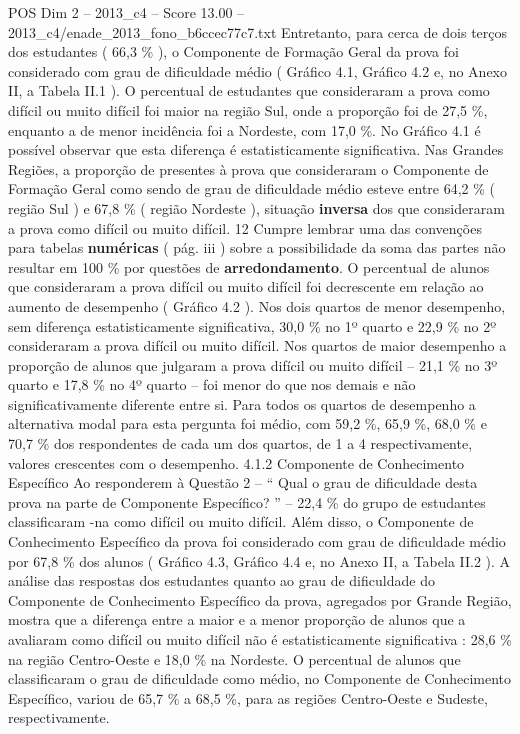 \begin{textsample}{POS Dim 2 – 2013\_c4 – Score 13.00 – 2013\_c4/enade\_2013\_fono\_b6ccec77c7.txt}
Entretanto, para cerca de dois terços dos estudantes ( 66,3 \% ), o Componente de Formação Geral da prova foi considerado com grau de dificuldade médio ( Gráfico 4.1, Gráfico 4.2 e, no Anexo II, a Tabela II.1 ).
O percentual de estudantes que consideraram a prova como difícil ou muito difícil foi maior na região Sul, onde a proporção foi de 27,5 \%, enquanto a de menor incidência foi a Nordeste, com 17,0 \%.
No Gráfico 4.1 é possível observar que esta diferença é estatisticamente significativa.
Nas Grandes Regiões, a proporção de presentes à prova que consideraram o Componente de Formação Geral como sendo de grau de dificuldade médio esteve entre 64,2 \% ( região Sul ) e 67,8 \% ( região Nordeste ), situação \textbf{inversa} dos que consideraram a prova como difícil ou muito difícil. 12 Cumpre lembrar uma das convenções para tabelas \textbf{numéricas} ( pág. iii ) sobre a possibilidade da soma das partes não resultar em 100 \% por questões de \textbf{arredondamento}.
O percentual de alunos que consideraram a prova difícil ou muito difícil foi decrescente em relação ao aumento de desempenho ( Gráfico 4.2 ).
Nos dois quartos de menor desempenho, sem diferença estatisticamente significativa, 30,0 \% no 1º quarto e 22,9 \% no 2º consideraram a prova difícil ou muito difícil.
Nos quartos de maior desempenho a proporção de alunos que julgaram a prova difícil ou muito difícil – 21,1 \% no 3º quarto e 17,8 \% no 4º quarto – foi menor do que nos demais e não significativamente diferente entre si.
Para todos os quartos de desempenho a alternativa modal para esta pergunta foi médio, com 59,2 \%, 65,9 \%, 68,0 \% e 70,7 \% dos respondentes de cada um dos quartos, de 1 a 4 respectivamente, valores crescentes com o desempenho. 4.1.2 Componente de Conhecimento Específico Ao responderem à Questão 2 – “ Qual o grau de dificuldade desta prova na parte de Componente Específico? ” – 22,4 \% do grupo de estudantes classificaram -na como difícil ou muito difícil.
Além disso, o Componente de Conhecimento Específico da prova foi considerado com grau de dificuldade médio por 67,8 \% dos alunos ( Gráfico 4.3, Gráfico 4.4 e, no Anexo II, a Tabela II.2 ).
A análise das respostas dos estudantes quanto ao grau de dificuldade do Componente de Conhecimento Específico da prova, agregados por Grande Região, mostra que a diferença entre a maior e a menor proporção de alunos que a avaliaram como difícil ou muito difícil não é estatisticamente significativa : 28,6 \% na região Centro-Oeste e 18,0 \% na Nordeste.
O percentual de alunos que classificaram o grau de dificuldade como médio, no Componente de Conhecimento Específico, variou de 65,7 \% a 68,5 \%, para as regiões Centro-Oeste e Sudeste, respectivamente.

\end{textsample}
